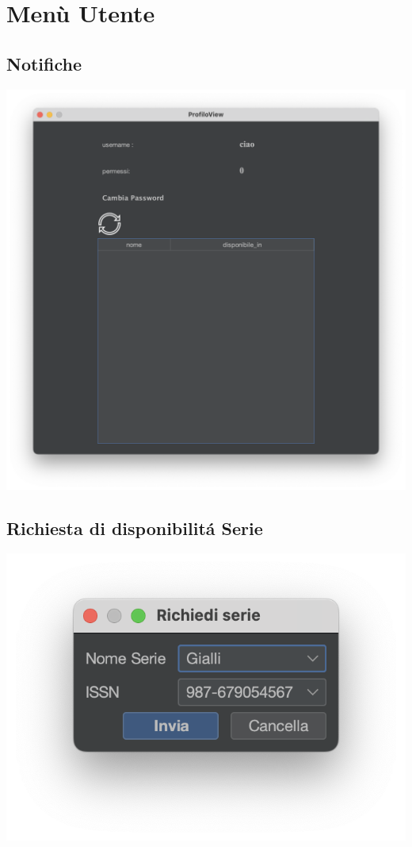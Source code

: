 \section{Menù Utente}
\subsection{Notifiche}
\includegraphics[scale=0.45]{Immagini/Schermate/Utente/NotificheUtente.png}
\subsection{Richiesta di disponibilit\'a Serie}
\includegraphics[scale=0.450]{Immagini/Schermate/Utente/RichiediDisponibilita.png}
